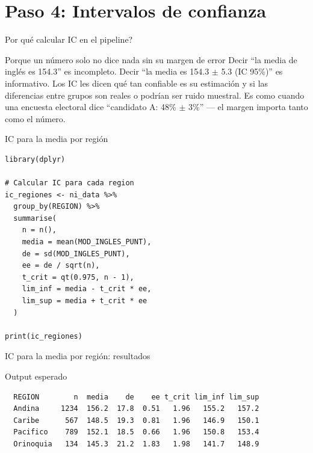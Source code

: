 \documentclass[aspectratio=169, 11pt]{beamer}
\begin{document}
\section{Paso 4: Intervalos de confianza}

\begin{frame}{\textquestiondown{}Por qu\'e calcular IC en el pipeline?}
\begin{exampleblock}{Porque un n\'umero solo no dice nada sin su margen de error}
\small
Decir ``la media de ingl\'es es 154.3'' es incompleto. Decir ``la media es 154.3 $\pm$ 5.3 (IC 95\%)'' es informativo. Los IC les dicen qu\'e tan confiable es su estimaci\'on y si las diferencias entre grupos son reales o podr\'ian ser ruido muestral. Es como cuando una encuesta electoral dice ``candidato A: 48\% $\pm$ 3\%'' --- el margen importa tanto como el n\'umero.
\end{exampleblock}
\end{frame}

\begin{frame}[fragile]{IC para la media por región}
\begin{lstlisting}
library(dplyr)

# Calcular IC para cada region
ic_regiones <- ni_data %>%
  group_by(REGION) %>%
  summarise(
    n = n(),
    media = mean(MOD_INGLES_PUNT),
    de = sd(MOD_INGLES_PUNT),
    ee = de / sqrt(n),
    t_crit = qt(0.975, n - 1),
    lim_inf = media - t_crit * ee,
    lim_sup = media + t_crit * ee
  )

print(ic_regiones)
\end{lstlisting}
\end{frame}

\begin{frame}[fragile]{IC para la media por región: resultados}
\begin{exampleblock}{Output esperado}
\small
\begin{verbatim}
  REGION        n  media    de    ee t_crit lim_inf lim_sup
  Andina     1234  156.2  17.8  0.51   1.96   155.2   157.2
  Caribe      567  148.5  19.3  0.81   1.96   146.9   150.1
  Pacifico    789  152.1  18.5  0.66   1.96   150.8   153.4
  Orinoquia   134  145.3  21.2  1.83   1.98   141.7   148.9
\end{verbatim}
\end{exampleblock}
\end{frame}
\end{document}
